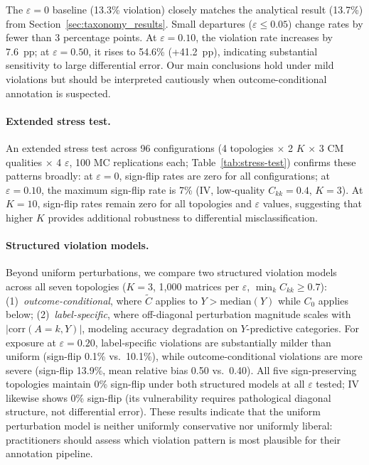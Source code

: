 The $\varepsilon{=}0$ baseline (13.3\% violation) closely matches the analytical result (13.7\%) from Section~\ref{sec:taxonomy_results}. Small departures ($\varepsilon \leq 0.05$) change rates by fewer than 3 percentage points. At $\varepsilon{=}0.10$, the violation rate increases by 7.6~pp; at $\varepsilon{=}0.50$, it rises to 54.6\% (+41.2~pp), indicating substantial sensitivity to large differential error. Our main conclusions hold under mild violations but should be interpreted cautiously when outcome-conditional annotation is suspected.

\paragraph{Extended stress test.}
An extended stress test across 96 configurations (4 topologies $\times$ 2 $K$ $\times$ 3 CM qualities $\times$ 4 $\varepsilon$, 100 MC replications each; Table~\ref{tab:stress-test}) confirms these patterns broadly: at $\varepsilon{=}0$, sign-flip rates are zero for all configurations; at $\varepsilon{=}0.10$, the maximum sign-flip rate is 7\% (IV, low-quality $C_{kk}{=}0.4$, $K{=}3$). At $K{=}10$, sign-flip rates remain zero for all topologies and $\varepsilon$ values, suggesting that higher $K$ provides additional robustness to differential misclassification.



\paragraph{Structured violation models.}
Beyond uniform perturbations, we compare two structured violation models across all seven topologies ($K{=}3$, 1{,}000 matrices per $\varepsilon$, $\min_k C_{kk}{\geq}0.7$): (1)~\emph{outcome-conditional}, where $\tilde{C}$ applies to $Y{>}\text{median}(Y)$ while $C_0$ applies below; (2)~\emph{label-specific}, where off-diagonal perturbation magnitude scales with $|\text{corr}(A{=}k, Y)|$, modeling accuracy degradation on $Y$-predictive categories. For exposure at $\varepsilon{=}0.20$, label-specific violations are substantially milder than uniform (sign-flip 0.1\% vs.\ 10.1\%), while outcome-conditional violations are more severe (sign-flip 13.9\%, mean relative bias 0.50 vs.\ 0.40). All five sign-preserving topologies maintain 0\% sign-flip under both structured models at all $\varepsilon$ tested; IV likewise shows 0\% sign-flip (its vulnerability requires pathological diagonal structure, not differential error). These results indicate that the uniform perturbation model is neither uniformly conservative nor uniformly liberal: practitioners should assess which violation pattern is most plausible for their annotation pipeline.

